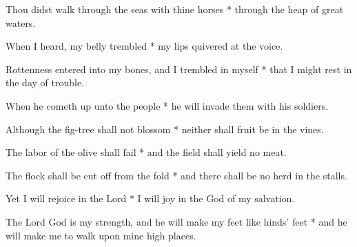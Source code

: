 Thou didst walk through the seas with thine horses * through the heap of great waters.

When I heard, my belly trembled * my lips quivered at the voice.

Rottenness entered into my bones, and I trembled in myself * that I might rest in the day of trouble.

When he cometh up unto the people * he will invade them with his soldiers.

Although the fig-tree shall not blossom * neither shall fruit be in the vines.

The labor of the olive shall fail * and the field shall yield no meat.

The flock shall be cut off from the fold * and there shall be no herd in the stalls.

Yet I will rejoice in the Lord * I will joy in the God of my salvation.

The Lord God is my strength, and he will make my feet like hinds' feet * and he will make me to walk upon mine high places.